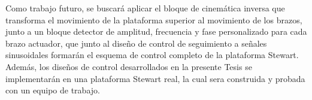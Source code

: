 Como trabajo futuro, se buscará aplicar el bloque de cinemática inversa que transforma el movimiento de la plataforma superior al movimiento de los brazos, junto a un bloque detector de amplitud, frecuencia y fase personalizado para cada brazo actuador, que junto al diseño de control de seguimiento a señales sinusoidales formarán el esquema de control completo de la plataforma Stewart. Además, los diseños de control desarrollados en la presente Tesis se implementarán en una plataforma Stewart real, la cual sera construida y probada con un equipo de trabajo. 
